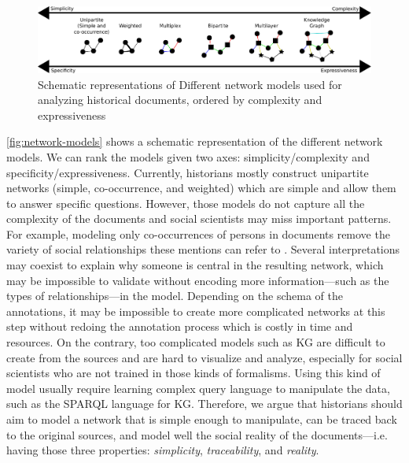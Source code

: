 \begin{figure}
    \centering %
    \includegraphics[width=\columnwidth]{static/figures/HSNAProcess/OriginalPaperFigures/models.pdf}
    \caption{Schematic representations of Different network models used for analyzing historical documents, ordered by complexity and expressiveness}
    \label{fig:network-models}
\end{figure}

\autoref{fig:network-models} shows a schematic representation of the different network models.
We can rank the models given two axes: simplicity/complexity and specificity/expressiveness.
Currently, historians mostly construct unipartite networks (simple, co-occurrence, and weighted) which are simple and allow them to answer specific questions.
However, those models do not capture all the complexity of the documents and social scientists may miss important patterns.
For example, modeling only co-occurrences of persons in documents remove the variety of social relationships these mentions can refer to \cite{lemercier12FormalNetwork2015}.
Several interpretations may coexist to explain why someone is central in the resulting network, which may be impossible to validate without encoding more information---such as the types of relationships---in the model.
Depending on the schema of the annotations, it may be impossible to create more complicated networks at this step without redoing the annotation process which is costly in time and resources.
On the contrary, too complicated models such as KG are difficult to create from the sources and are hard to visualize and analyze, especially for social scientists who are not trained in those kinds of formalisms.
Using this kind of model usually require learning complex query language to manipulate the data, such as the SPARQL language for KG\@.
Therefore, we argue that historians should aim to model a network that is simple enough to manipulate, can be traced back to the original sources, and model well the social reality of the documents---i.e. having those three properties: \textit{simplicity}, \textit{traceability}, and \textit{reality}.

